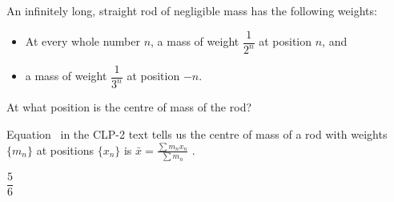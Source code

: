 \begin{Mquestion}
An infinitely long, straight rod of negligible mass has the following weights:
\begin{itemize}
\item At every whole number $n$, a mass of weight $\dfrac{1}{2^n}$ at position $n$, and
\item a mass of weight $\dfrac{1}{3^n}$ at position $-n$.
\end{itemize}
At what position is the centre of mass of the rod?
\begin{center}
\end{center}

\end{Mquestion}
\begin{hint}
Equation~ in the CLP-2 text tells us the centre of mass of a rod with weights $\{m_n\}$ at positions $\{x_n\}$ is $\displaystyle\bar x =\frac{\sum m_nx_n}{\sum m_n}$ .
\end{hint}
\begin{answer}
	$\dfrac{5}{6}$
\end{answer}
